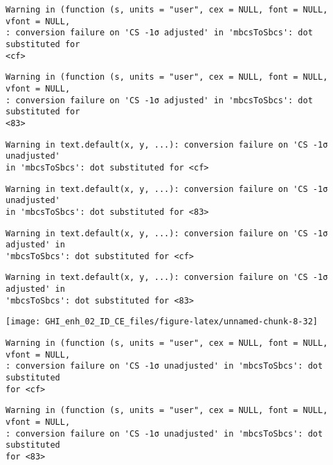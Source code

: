 \documentclass[
  10pt,
  a4paper,oneside]{article}
\begin{document}
\begin{verbatim}
Warning in (function (s, units = "user", cex = NULL, font = NULL, vfont = NULL,
: conversion failure on 'CS -1σ adjusted' in 'mbcsToSbcs': dot substituted for
<cf>
\end{verbatim}

\begin{verbatim}
Warning in (function (s, units = "user", cex = NULL, font = NULL, vfont = NULL,
: conversion failure on 'CS -1σ adjusted' in 'mbcsToSbcs': dot substituted for
<83>
\end{verbatim}

\begin{verbatim}
Warning in text.default(x, y, ...): conversion failure on 'CS -1σ unadjusted'
in 'mbcsToSbcs': dot substituted for <cf>
\end{verbatim}

\begin{verbatim}
Warning in text.default(x, y, ...): conversion failure on 'CS -1σ unadjusted'
in 'mbcsToSbcs': dot substituted for <83>
\end{verbatim}

\begin{verbatim}
Warning in text.default(x, y, ...): conversion failure on 'CS -1σ adjusted' in
'mbcsToSbcs': dot substituted for <cf>
\end{verbatim}

\begin{verbatim}
Warning in text.default(x, y, ...): conversion failure on 'CS -1σ adjusted' in
'mbcsToSbcs': dot substituted for <83>
\end{verbatim}

\begin{center}\texttt{[image: GHI\_enh\_02\_ID\_CE\_files/figure-latex/unnamed-chunk-8-32]} \end{center}

\begin{verbatim}
Warning in (function (s, units = "user", cex = NULL, font = NULL, vfont = NULL,
: conversion failure on 'CS -1σ unadjusted' in 'mbcsToSbcs': dot substituted
for <cf>
\end{verbatim}

\begin{verbatim}
Warning in (function (s, units = "user", cex = NULL, font = NULL, vfont = NULL,
: conversion failure on 'CS -1σ unadjusted' in 'mbcsToSbcs': dot substituted
for <83>
\end{verbatim}
\end{document}

